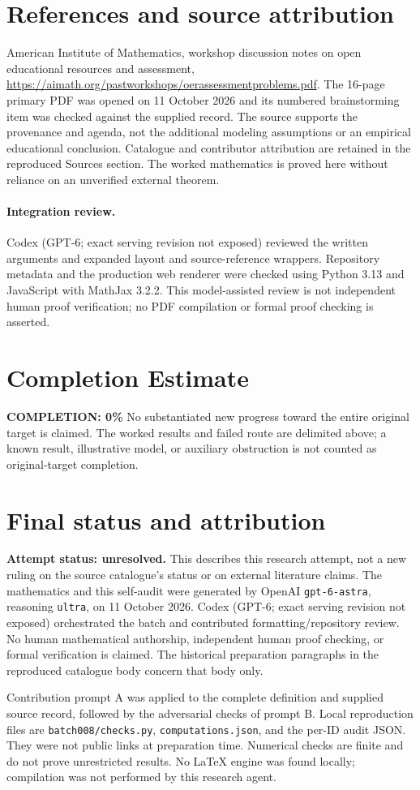 \documentclass[11pt]{article}
\begin{document}
\section{References and source attribution}
American Institute of Mathematics, workshop discussion notes on open educational resources and assessment, \url{https://aimath.org/pastworkshops/oerassessmentproblems.pdf}. The 16-page primary PDF was opened on 11 October 2026 and its numbered brainstorming item was checked against the supplied record. The source supports the provenance and agenda, not the additional modeling assumptions or an empirical educational conclusion. Catalogue and contributor attribution are retained in the reproduced Sources section. The worked mathematics is proved here without reliance on an unverified external theorem.


\paragraph{Integration review.} Codex (GPT-6; exact serving revision not exposed) reviewed the written arguments and expanded layout and source-reference wrappers. Repository metadata and the production web renderer were checked using Python 3.13 and JavaScript with MathJax 3.2.2. This model-assisted review is not independent human proof verification; no PDF compilation or formal proof checking is asserted.

\section{Completion Estimate}
\noindent\textbf{COMPLETION: 0\%}
No substantiated new progress toward the entire original target is claimed. The worked results and failed route are delimited above; a known result, illustrative model, or auxiliary obstruction is not counted as original-target completion.

\section{Final status and attribution}
\textbf{Attempt status: unresolved.} This describes this research attempt, not a new ruling on the source catalogue's status or on external literature claims.
The mathematics and this self-audit were generated by OpenAI \texttt{gpt-6-astra}, reasoning \texttt{ultra}, on 11 October 2026. Codex (GPT-6; exact serving revision not exposed) orchestrated the batch and contributed formatting/repository review. No human mathematical authorship, independent human proof checking, or formal verification is claimed. The historical preparation paragraphs in the reproduced catalogue body concern that body only.

Contribution prompt A was applied to the complete definition and supplied source record, followed by the adversarial checks of prompt B. Local reproduction files are \texttt{batch008/checks.py}, \texttt{computations.json}, and the per-ID audit JSON. They were not public links at preparation time. Numerical checks are finite and do not prove unrestricted results. No LaTeX engine was found locally; compilation was not performed by this research agent.
\end{document}
